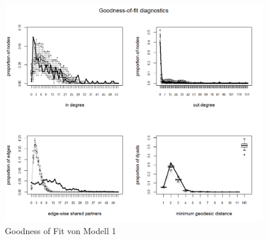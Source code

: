 \documentclass[a4paper,ngerman,oneside,titlepage,bibliography=totoc,11pt]{scrreprt}
\begin{document}
\begin{figure}[ht]
	\centering
		\includegraphics[width=1\textwidth]{../ERGM/GOF3.png}
	\caption{Goodness of Fit von Modell 1}
	\label{fig:gof.model1}
\end{figure}




\newpage









\newpage
\listoffigures
\newpage
\listoftables
\end{document}
